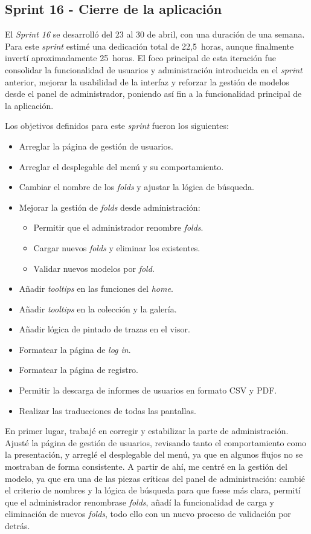 \subsection{Sprint 16 - Cierre de la aplicación}
El \textit{Sprint 16} se desarrolló del 23 al 30 de abril, con una duración de una semana. Para este \textit{sprint} estimé una dedicación total de 22,5~horas, aunque finalmente invertí aproximadamente 25~horas. El foco principal de esta iteración fue consolidar la funcionalidad de usuarios y administración introducida en el \textit{sprint} anterior, mejorar la usabilidad de la interfaz y reforzar la gestión de modelos desde el panel de administrador, poniendo así fin a la funcionalidad principal de la aplicación.

Los objetivos definidos para este \textit{sprint} fueron los siguientes:
\begin{itemize}
	\item Arreglar la página de gestión de usuarios.
	\item Arreglar el desplegable del menú y su comportamiento.
	\item Cambiar el nombre de los \textit{folds} y ajustar la lógica de búsqueda.
	\item Mejorar la gestión de \textit{folds} desde administración:
	\begin{itemize}
		\item Permitir que el administrador renombre \textit{folds}.
		\item Cargar nuevos \textit{folds} y eliminar los existentes.
		\item Validar nuevos modelos por \textit{fold}.
	\end{itemize}
	\item Añadir \textit{tooltips} en las funciones del \textit{home}.
	\item Añadir \textit{tooltips} en la colección y la galería.
	\item Añadir lógica de pintado de trazas en el visor.
	\item Formatear la página de \textit{log in}.
	\item Formatear la página de registro.
	\item Permitir la descarga de informes de usuarios en formato CSV y PDF.
	\item Realizar las traducciones de todas las pantallas.
\end{itemize}

En primer lugar, trabajé en corregir y estabilizar la parte de administración. Ajusté la página de gestión de usuarios, revisando tanto el comportamiento como la presentación, y arreglé el desplegable del menú, ya que en algunos flujos no se mostraban de forma consistente. A partir de ahí, me centré en la gestión del modelo, ya que era una de las piezas críticas del panel de administración: cambié el criterio de nombres y la lógica de búsqueda para que fuese más clara, permití que el administrador renombrase \textit{folds}, añadí la funcionalidad de carga y eliminación de nuevos \textit{folds}, todo ello con un nuevo proceso de validación por detrás.

